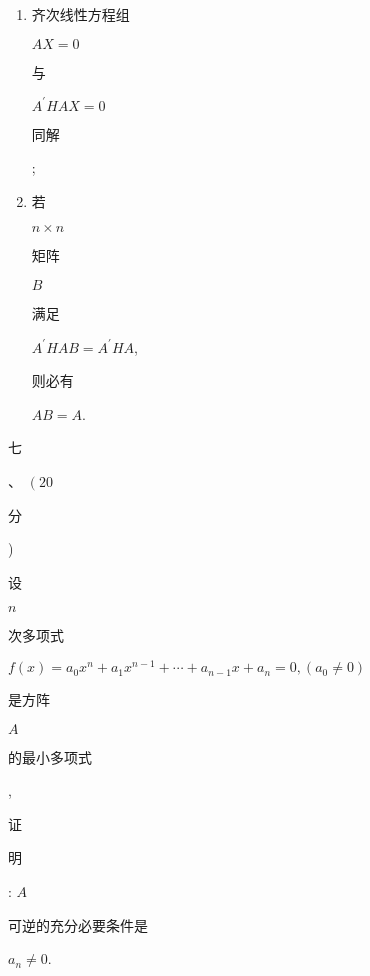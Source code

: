 \documentclass[10pt]{article}
\begin{document}
\begin{enumerate}
  \item \begin{CJK}{UTF8}{mj}齐次线性方程组\end{CJK} $A X=0$ \begin{CJK}{UTF8}{mj}与\end{CJK} $A^{\prime} H A X=0$ \begin{CJK}{UTF8}{mj}同解\end{CJK};

  \item \begin{CJK}{UTF8}{mj}若\end{CJK} $n \times n$ \begin{CJK}{UTF8}{mj}矩阵\end{CJK} $B$ \begin{CJK}{UTF8}{mj}满足\end{CJK} $A^{\prime} H A B=A^{\prime} H A$, \begin{CJK}{UTF8}{mj}则必有\end{CJK} $A B=A$.

\end{enumerate}
\begin{CJK}{UTF8}{mj}七\end{CJK}、 $\left(20\right.$ \begin{CJK}{UTF8}{mj}分\end{CJK}) \begin{CJK}{UTF8}{mj}设\end{CJK} $n$ \begin{CJK}{UTF8}{mj}次多项式\end{CJK} $f(x)=a_{0} x^{n}+a_{1} x^{n-1}+\cdots+a_{n-1} x+a_{n}=0,\left(a_{0} \neq 0\right)$ \begin{CJK}{UTF8}{mj}是方阵\end{CJK} $A$ \begin{CJK}{UTF8}{mj}的最小多项式\end{CJK}, \begin{CJK}{UTF8}{mj}证\end{CJK} \begin{CJK}{UTF8}{mj}明\end{CJK}: $A$ \begin{CJK}{UTF8}{mj}可逆的充分必要条件是\end{CJK} $a_{n} \neq 0$.
\end{document}
